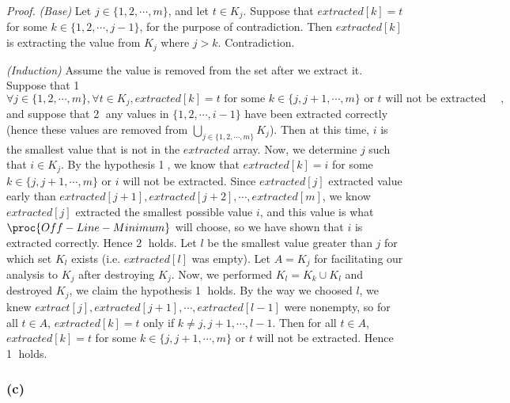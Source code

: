 \begin{proof}
    \textit{(Base)}
    Let $j \in \{ 1, 2, \cdots, m \}$,
    and let $t \in K_j$.
    Suppose that $extracted[k] = t$ 
    for some $k \in \{ 1, 2, \cdots, j - 1 \}$,
    for the purpose of contradiction.
    Then $extracted[k]$ is extracting the value from $K_j$
    where $j > k$.
    Contradiction.

    \textit{(Induction)}
    Assume the value is removed from the set after we extract it.
    Suppose that \textcircled{1}
    \begin{equation*}
        \forall j \in \{ 1, 2, \cdots, m \},
        \forall t \in K_j, 
        extracted[k] = t
        \text{ for some } k \in \{ j, j + 1, \cdots, m \}
        \text{ or $t$ will not be extracted }
        \quad,
    \end{equation*}
    and suppose that \textcircled{2} 
    any values in $\{ 1, 2, \cdots, i - 1 \}$ 
    have been extracted correctly (hence these values are removed from  
    $\bigcup\limits_{j \in \{ 1, 2, \cdots, m \}} K_j$).
    Then at this time, $i$ is the smallest value
    that is not in the $extracted$ array.
    Now, we determine $j$ such that $i \in K_j$.
    By the hypothesis \textcircled{1}, we know that $extracted[k] = i$
    for some $k \in \{ j, j + 1, \cdots, m \}$ 
    or $i$ will not be extracted.
    Since $extracted[j]$ extracted value
    early than $extracted[j + 1], extracted[j + 2], \cdots, extracted[m]$,
    we know $extracted[j]$ extracted the smallest possible value $i$, 
    and this value is what $\proc{Off-Line-Minimum}$
    will choose, so we have shown that $i$ is extracted correctly.
    Hence \textcircled{2} holds.
    Let $l$ be the smallest value greater than $j$ 
    for which set $K_l$ exists (i.e. $extracted[l]$ was empty).
    Let $A = K_j$ for facilitating our analysis to $K_j$ after destroying $K_j$.
    Now, we performed $K_l = K_k \cup K_l$ and destroyed $K_j$,
    we claim the hypothesis \textcircled{1} holds.
    By the way we choosed $l$, we knew 
    $extract[j], extracted[j + 1], \cdots, extracted[l - 1]$
    were nonempty, so for all $t \in A$,
    $extracted[k] = t$ only if $k \neq j, j + 1, \cdots, l - 1$.
    Then for all $t \in A$, 
    $extracted[k] = t$ for some $k \in \{ j, j + 1, \cdots, m \}$
    or $t$ will not be extracted.
    Hence \textcircled{1} holds.
\end{proof}

\subsubsection*{(c)}

